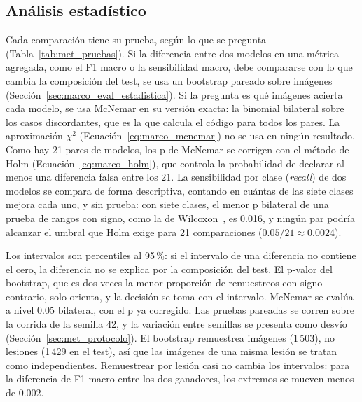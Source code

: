 \subsection{Análisis estadístico}
\label{sec:met_estadistica}

Cada comparación tiene su prueba, según lo que se pregunta (Tabla~\ref{tab:met_pruebas}). Si la diferencia entre dos modelos
en una métrica agregada, como el F1 macro o la sensibilidad macro, debe compararse con lo que cambia la composición del
test, se usa un bootstrap pareado sobre imágenes (Sección~\ref{sec:marco_eval_estadistica}). Si la pregunta es qué imágenes
acierta cada modelo, se usa McNemar en su versión exacta: la binomial bilateral sobre los casos discordantes, que es la que
calcula el código para todos los pares. La aproximación $\chi^2$ (Ecuación~\ref{eq:marco_mcnemar}) no se usa en ningún
resultado. Como hay 21 pares de modelos, los p de McNemar se corrigen con el método de Holm (Ecuación~\ref{eq:marco_holm}),
que controla la probabilidad de declarar al menos una diferencia falsa entre los 21. La sensibilidad por clase (\emph{recall}) de dos modelos se
compara de forma descriptiva, contando en cuántas de las siete clases mejora cada uno, y sin prueba: con siete clases, el
menor p bilateral de una prueba de rangos con signo, como la de Wilcoxon~\cite{wilcoxon1945individual}, es 0.016, y ningún par podría
alcanzar el umbral que Holm exige para 21 comparaciones ($0.05/21 \approx 0.0024$).

Los intervalos son percentiles al 95\,\%: si el intervalo de una diferencia no contiene el cero, la diferencia no se
explica por la composición del test. El p-valor del bootstrap, que es dos veces la menor proporción de remuestreos con
signo contrario, solo orienta, y la decisión se toma con el intervalo. McNemar se evalúa a nivel 0.05 bilateral,
con el p ya corregido. Las pruebas pareadas se corren sobre la corrida de la semilla 42, y la variación entre semillas se presenta como
desvío (Sección~\ref{sec:met_protocolo}). El
bootstrap remuestrea imágenes (1\,503), no lesiones (1\,429 en el test), así que las imágenes de una misma lesión se tratan
como independientes. Remuestrear por lesión casi no cambia los intervalos: para la diferencia de F1 macro entre los
dos ganadores, los extremos se mueven menos de 0.002.

